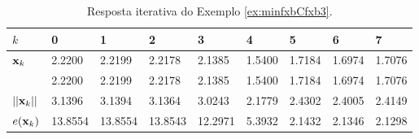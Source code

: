 \begin{table}[h!]
\centering
\begin{tabular}{|l|l|l|l|l|l|l|l|l|}
\hline
$k$ & 0 & 1 & 2 & 3 & 4 & 5 & 6 & 7\\ \hline
$\VECTOR{x}_k$ & 2.2200   & 2.2199   & 2.2178   & 2.1385   & 1.5400   & 1.7184   & 1.6974   & 1.7076 \\ 
~              & 2.2200   & 2.2199   & 2.2178   & 2.1385   & 1.5400   & 1.7184   & 1.6974   & 1.7076 \\ \hline
$||\VECTOR{x}_k||$ & 3.1396   & 3.1394   & 3.1364   & 3.0243   & 2.1779   & 2.4302   & 2.4005   & 2.4149 \\ \hline
$e(\VECTOR{x}_k)$ & 13.8554  & 13.8554  & 13.8543  & 12.2971   & 5.3932   & 2.1432   & 2.1346   & 2.1298 \\ \hline
\end{tabular}
\caption{Resposta iterativa do Exemplo \ref{ex:minfxbCfxb3}.}
\label{table:ex:minfxbCfxb3}
\end{table}
